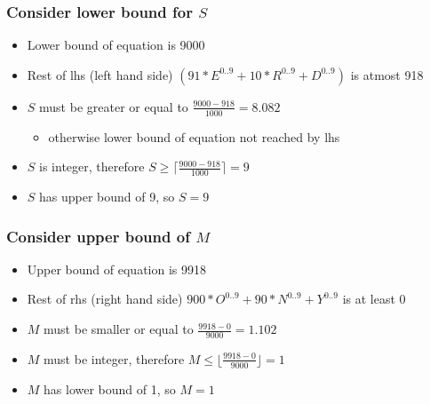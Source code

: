 \begin{frame}
\frametitle{Consider lower bound for $S$}
\begin{itemize}
\item Lower bound of equation is 9000
\item Rest of lhs (left hand side) $(91*E^{0..9}+10*R^{0..9}+D^{0..9})$ is atmost 918
\item $S$ must be greater or equal to $\frac{9000-918}{1000}=8.082$
\begin{itemize}
\item otherwise lower bound of equation not reached by lhs
\end{itemize}
\item $S$ is integer, therefore $S \geq \lceil \frac{9000-918}{1000} \rceil = 9$
\item $S$ has upper bound of 9, so $S = 9$
\end{itemize}
\end{frame}

\begin{frame}
\frametitle{Consider upper bound of $M$}
\begin{itemize}
\item Upper bound of equation is 9918
\item Rest of rhs (right hand side) $900*O^{0..9}+ 90*N^{0..9} + Y^{0..9}$ is at least 0
\item $M$ must be smaller or equal to $\frac{9918-0}{9000}=1.102$
\item $M$ must be integer, therefore $M \leq \lfloor \frac{9918-0}{9000} \rfloor = 1$ 
\item $M$ has lower bound of 1, so $M=1$ 
\end{itemize}
\end{frame}

